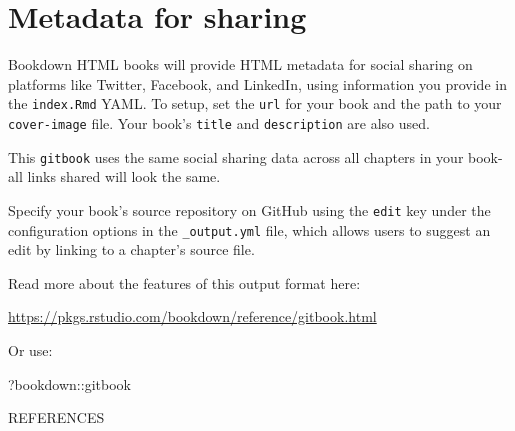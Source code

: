 \documentclass[12pt, oneside, openright]{byuthesis}
\newenvironment{Shaded}{\begin{snugshade}}{\end{snugshade}}
\newcommand{\NormalTok}[1]{#1}
\newcommand{\SpecialCharTok}[1]{\textcolor[rgb]{0.00,0.00,0.00}{#1}}
\begin{document}
\hypertarget{metadata-for-sharing}{%
\section{Metadata for sharing}\label{metadata-for-sharing}}

Bookdown HTML books will provide HTML metadata for social sharing on platforms like Twitter, Facebook, and LinkedIn, using information you provide in the \texttt{index.Rmd} YAML. To setup, set the \texttt{url} for your book and the path to your \texttt{cover-image} file. Your book's \texttt{title} and \texttt{description} are also used.

This \texttt{gitbook} uses the same social sharing data across all chapters in your book- all links shared will look the same.

Specify your book's source repository on GitHub using the \texttt{edit} key under the configuration options in the \texttt{\_output.yml} file, which allows users to suggest an edit by linking to a chapter's source file.

Read more about the features of this output format here:

\url{https://pkgs.rstudio.com/bookdown/reference/gitbook.html}

Or use:

\begin{Shaded}
\begin{Highlighting}[]
\NormalTok{?bookdown}\SpecialCharTok{::}\NormalTok{gitbook}
\end{Highlighting}
\end{Shaded}

\cleardoublepage
    \begin{centering}
    REFERENCES\\
     \baselineskip
    \end{centering}
\end{document}
